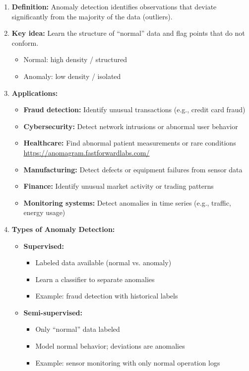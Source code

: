\documentclass{article}
\begin{document}
\begin{enumerate}
\item \textbf{Definition:} Anomaly detection identifies observations that deviate significantly from the majority of the data (outliers).

\item \textbf{Key idea:} Learn the structure of ``normal'' data and flag points that do not conform.

\begin{itemize}
\item Normal: high density / structured
\item Anomaly: low density / isolated
\end{itemize}

\item \textbf{Applications:}
\begin{itemize}
    \item \textbf{Fraud detection:} Identify unusual transactions (e.g., credit card fraud)
    \item \textbf{Cybersecurity:} Detect network intrusions or abnormal user behavior
    \item \textbf{Healthcare:} Find abnormal patient measurements or rare conditions \url{https://anomagram.fastforwardlabs.com/}
    \item \textbf{Manufacturing:} Detect defects or equipment failures from sensor data
    \item \textbf{Finance:} Identify unusual market activity or trading patterns
    \item \textbf{Monitoring systems:} Detect anomalies in time series (e.g., traffic, energy usage)
\end{itemize}

\item \textbf{Types of Anomaly Detection:}
\begin{itemize}
    \item \textbf{Supervised:} 
    \begin{itemize}
        \item Labeled data available (normal vs. anomaly)
        \item Learn a classifier to separate anomalies
        \item Example: fraud detection with historical labels
    \end{itemize}
    
    \item \textbf{Semi-supervised:} 
    \begin{itemize}
        \item Only ``normal'' data labeled
        \item Model normal behavior; deviations are anomalies
        \item Example: sensor monitoring with only normal operation logs
    \end{itemize}
    

\end{itemize}
\end{enumerate}
\end{document}
